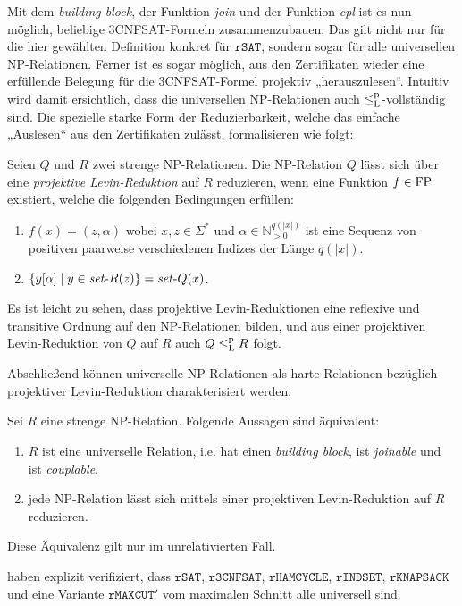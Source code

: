 Mit dem \emph{building block}, der Funktion \emph{join} und der Funktion \emph{cpl} ist es nun möglich, beliebige 3CNFSAT-Formeln zusammenzubauen.
Das gilt nicht nur für die hier gewählten Definition konkret für $\mathtt{rSAT}$, sondern sogar für alle universellen NP-Relationen.
Ferner ist es sogar möglich, aus den Zertifikaten wieder eine erfüllende Belegung für die 3CNFSAT-Formel projektiv „herauszulesen“.
Intuitiv wird damit ersichtlich, dass die universellen NP-Relationen auch $\leq_\mathrm{L}^\mathrm{p}$-vollständig sind.
Die spezielle starke Form der Reduzierbarkeit, welche das einfache „Auslesen“ aus den Zertifikaten zulässt, formalisieren \citeauthor{agrawal_universal_1992} wie folgt:
\begin{definition}\label{def:projective-reduction}
    Seien $Q$ und $R$ zwei strenge NP-Relationen.
    Die NP-Relation $Q$ lässt sich über eine \emph{projektive Levin-Reduktion} auf $R$ reduzieren, wenn eine Funktion $f\in\mathrm{FP}$ existiert, welche die folgenden Bedingungen erfüllen:
    \begin{enumerate}
        \item $f(x)=(z,\alpha)$ wobei $x,z\in\Sigma^*$ und $\alpha\in\mathbb N_{>0}^{q(|x|)}$ ist eine Sequenz von positiven paarweise verschiedenen  Indizes der Länge $q(|x|)$.
        \item $\{ y[\alpha] \mid y\in \mathit{set}\text{-}{}R(z) \} = \mathit{set}\text{-}{}Q(x)$. \qedhere
    \end{enumerate}
\end{definition}
Es ist leicht zu sehen, dass projektive Levin-Reduktionen eine reflexive und transitive Ordnung auf den NP-Relationen bilden, und aus einer projektiven Levin-Reduktion von $Q$ auf $R$ auch $Q\leq_\mathrm{L}^\mathrm{p} R$ folgt. 

Abschließend können universelle NP-Relationen als harte Relationen bezüglich projektiver Levin-Reduktion charakterisiert werden:
\begin{theorem}\label{thm:universal-relations}
    Sei $R$ eine strenge NP-Relation.
    Folgende Aussagen sind äquivalent:
    \begin{enumerate}
        \item $R$ ist eine universelle Relation, i.e.  hat einen \emph{building block}, ist \emph{joinable} und ist \emph{couplable}.
        \item jede NP-Relation lässt sich mittels einer projektiven Levin-Reduktion auf $R$ reduzieren.
    \end{enumerate}
    Diese Äquivalenz gilt nur im unrelativierten Fall.
\end{theorem}
\textcite{agrawal_universal_1992} haben explizit verifiziert, dass $\mathtt{rSAT}$, $\mathtt{r3CNFSAT}$, $\mathtt{rHAMCYCLE}$, $\mathtt{rINDSET}$, $\mathtt{rKNAPSACK}$ und eine Variante $\mathtt{rMAXCUT}'$ vom maximalen Schnitt alle universell sind.

